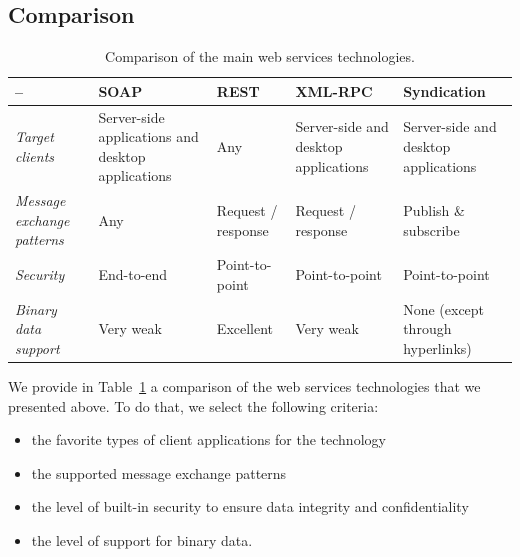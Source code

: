 
\subsection{Comparison}


\begin{table}[htbp]
\footnotesize
\centering
\begin{tabular}{|p{2.6cm}|p{2.1cm}|p{2.1cm}|p{2.1cm}|p{2.1cm}|}
  
  \hline
  
  -- &
  \textbf{SOAP} &
  \textbf{REST} &
  \textbf{XML-RPC} &
  \textbf{Syndication} \\
  
  \hline
  
  \textit{Target clients} &
  Server-side applications and desktop applications &
  Any &
  Server-side and desktop applications &
  Server-side and desktop applications \\
  
  \hline
  
  \textit{Message exchange patterns} &
  Any &
  Request / response &
  Request / response &
  Publish \& subscribe \\
  
  \hline
  
  \textit{Security} &
  End-to-end &
  Point-to-point &
  Point-to-point &
  Point-to-point \\
  
  \hline
  
  \textit{Binary data support} &
  Very weak &
  Excellent &
  Very weak &
  None (except through hyperlinks) \\
  
  \hline
  
\end{tabular}
\caption{Comparison of the main web services technologies.}
\label{tab:ws-techno-comparison}
\end{table}

We provide in Table~\ref{tab:ws-techno-comparison} a comparison of the web services technologies that we presented above. To do that, we select the following criteria:
\begin{itemize}

	\item the favorite types of client applications for the technology
	
	\item the supported message exchange patterns
	
	\item the level of built-in security to ensure data integrity and confidentiality
	
	\item the level of support for binary data.

\end{itemize}\

